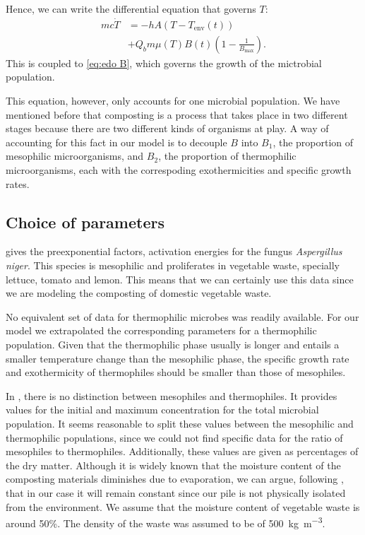 \documentclass[12pt, a4paper, twocolumn, twoside]{article}
\numberwithin{table}{section}
\numberwithin{figure}{section}
\numberwithin{equation}{section}
\begin{document}
Hence, we can write the differential equation that governs \( T \): 
\begin{equation} \label{eq:edo T}
	\begin{aligned}
		mc\dot{T} & = -hA\left(T - T_\text{env}(t)\right) \\
							& + Q_bm\mu(T)B(t)\left(1 - \frac{1}{B_\text{max}}\right). 
	\end{aligned}
\end{equation}
	This is coupled to \cref{eq:edo B}, which governs the growth of the mictrobial population.  

	This equation, however, only accounts for one microbial population. We have mentioned before that composting is a process that takes place in two different stages because there are two different kinds of organisms at play. A way of accounting for this fact in our model is to decouple \( B \) into \( B_1 \), the proportion of mesophilic microorganisms, and \( B_2 \), the proportion of thermophilic microorganisms, each with the correspoding exothermicities and specific growth rates. 

\subsection{Choice of parameters}
\cite{saucedo} gives the preexponential factors, activation energies for the fungus \textit{Aspergillus niger}. This species is mesophilic and proliferates in vegetable waste, specially lettuce, tomato and lemon. This means that we can certainly use this data since we are modeling the composting of domestic vegetable waste. 

No equivalent set of data for thermophilic microbes was readily available. For our model we extrapolated the corresponding parameters for a thermophilic population. Given that the thermophilic phase usually is longer and entails a smaller temperature change than the mesophilic phase, the specific growth rate and exothermicity of thermophiles should be smaller than those of mesophiles. 

In \cite{saucedo}, there is no distinction between mesophiles and thermophiles. It provides values for the initial and maximum concentration for the total microbial population. It seems reasonable to split these values between the mesophilic and thermophilic populations, since we could not find specific data for the ratio of mesophiles to thermophiles. Additionally, these values are given as percentages of the dry matter. Although it is widely known that the moisture content of the composting materials diminishes due to evaporation, we can argue, following \cite{niceassumptions}, that in our case it will remain constant since our pile is not physically isolated from the environment. We assume that the moisture content of vegetable waste is around 50\%. The density of the waste was assumed to be of \SI{500}{kg.m^{-3}}. 
\end{document}
